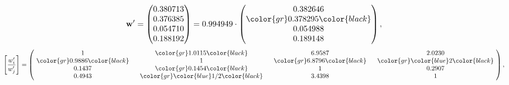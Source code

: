 \begin{example}
\begin{equation*}
\mathbf{w}^{\prime} =
\begin{pmatrix}
0.380713\\
0.376385\\
0.054710\\
0.188192
\end{pmatrix} =
0.994949\cdot
\begin{pmatrix}
0.382646\\
\color{gr} 0.378295\color{black} \\
0.054988\\
0.189148
\end{pmatrix},
\end{equation*}
\begin{equation*}
\left[ \frac{{w}^{\prime}_i}{{w}^{\prime}_j} \right] =
\begin{pmatrix}
$\,\,$ 1 $\,\,$ & $\,\,$\color{gr} 1.0115\color{black} $\,\,$ & $\,\,$6.9587$\,\,$ & $\,\,$2.0230$\,\,$ \\
$\,\,$\color{gr} 0.9886\color{black} $\,\,$ & $\,\,$ 1 $\,\,$ & $\,\,$\color{gr} 6.8796\color{black} $\,\,$ & $\,\,$\color{gr} \color{blue} 2\color{black}   $\,\,$ \\
$\,\,$0.1437$\,\,$ & $\,\,$\color{gr} 0.1454\color{black} $\,\,$ & $\,\,$ 1 $\,\,$ & $\,\,$0.2907 $\,\,$ \\
$\,\,$0.4943$\,\,$ & $\,\,$\color{gr} \color{blue}  1/2\color{black} $\,\,$ & $\,\,$3.4398$\,\,$ & $\,\,$ 1  $\,\,$ \\
\end{pmatrix},
\end{equation*}
\end{example}
\newpage

